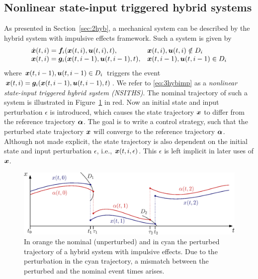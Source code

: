 \documentclass[../DC2017114Bouma.tex]{subfiles}
\begin{document}
\subsection{Nonlinear state-input triggered hybrid systems}
As presented in Section~\ref{sec:2hyb}, a mechanical system can be described by the hybrid system with impulsive effects framework. Such a system is given by
\begin{equation}
\begin{array}{ll}
\dot{{\boldsymbol{x}}}(t,i) ={\boldsymbol{f}}_i({\boldsymbol{x}}(t,i),{\boldsymbol{u}}(t,i),t),& {\boldsymbol{x}}(t,i),{\boldsymbol{u}}(t,i)\notin D_i\\
{\boldsymbol{x}}(t,i) = {\boldsymbol{g}}_i({\boldsymbol{x}}(t,i-1),{\boldsymbol{u}}(t,i-1),t),& {\boldsymbol{x}}(t,i-1),{\boldsymbol{u}}(t,i-1)\in D_i
\end{array}\label{eq:3hybimp}
\end{equation}
where ${\boldsymbol{x}}(t,i-1),{\boldsymbol{u}}(t,i-1)\in D_i$ triggers the event ${\boldsymbol{x}}(t,i) = {\boldsymbol{g}}_i({\boldsymbol{x}}(t,i-1),{\boldsymbol{u}}(t,i-1),t)$. We refer to \eqref{eq:3hybimp} as a \textit{nonlinear state-input triggered hybrid system (NSITHS)}. The nominal trajectory of such a system is illustrated in Figure~\ref{fig:3perturbedtraj} in red. Now an initial state and input perturbation $\epsilon$ is introduced, which causes the state trajectory ${\boldsymbol{x}}$ to differ from the reference trajectory $\boldsymbol{\alpha}$. The goal is to write a control strategy, such that the perturbed state trajectory ${\boldsymbol{x}}$ will converge to the reference trajectory $\boldsymbol{\alpha}$. Although not made explicit, the state trajectory is also dependent on the initial state and input perturbation $\epsilon$, i.e., ${\boldsymbol{x}}(t,i,\epsilon)$. This $\epsilon$ is left implicit in later uses of ${\boldsymbol{x}}$.
\begin{figure}[h]
\centering
\includegraphics[width=.8\textwidth]{perturbedtraj.eps}\caption{In orange the nominal (unperturbed) and in cyan the perturbed trajectory of a hybrid system with impulsive effects. Due to the perturbation in the cyan trajectory, a mismatch between the perturbed and the nominal event times arises.} \label{fig:3perturbedtraj}
\end{figure}
\end{document}
